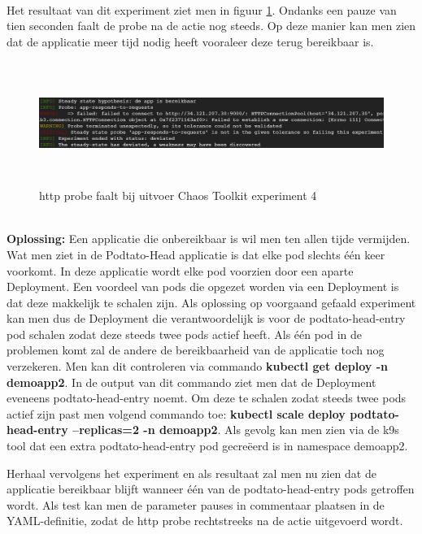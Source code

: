 \\ \newline Het resultaat van dit experiment ziet men in figuur \ref{img:chaostoolkitex4}. Ondanks een pauze van tien seconden faalt de probe na de actie nog steeds. Op deze manier kan men zien dat de applicatie meer tijd nodig heeft vooraleer deze terug bereikbaar is.

\begin{figure}[h]
    \centering
    \includegraphics[width=15cm, height=4cm]{img/chaostoolkit-ex4.png}
    \caption{http probe faalt bij uitvoer Chaos Toolkit experiment 4}
    \label{img:chaostoolkitex4}
\end{figure}

\\ {\bf Oplossing:} Een applicatie die onbereikbaar is wil men ten allen tijde vermijden. Wat men ziet in de Podtato-Head applicatie is dat elke pod slechts één keer voorkomt. In deze applicatie wordt elke pod voorzien door een aparte Deployment. Een voordeel van pods die opgezet worden via een Deployment is dat deze makkelijk te schalen zijn.
Als oplossing op voorgaand gefaald experiment kan men dus de Deployment die verantwoordelijk is voor de podtato-head-entry pod schalen zodat deze steeds twee pods actief heeft. Als één pod in de problemen komt zal de andere de bereikbaarheid van de applicatie toch nog verzekeren. 
Men kan dit controleren via commando {\bf kubectl get deploy -n demoapp2}. In de output van dit commando ziet men dat de Deployment eveneens podtato-head-entry noemt. Om deze te schalen zodat steeds twee pods actief zijn past men volgend commando toe: {\bf kubectl scale deploy podtato-head-entry --replicas=2 -n demoapp2}. Als gevolg kan men zien via de k9s tool dat een extra podtato-head-entry pod gecreëerd is in namespace demoapp2.

Herhaal vervolgens het experiment en als resultaat zal men nu zien dat de applicatie bereikbaar blijft wanneer één van de podtato-head-entry pods getroffen wordt. Als test kan men de parameter pauses in commentaar plaatsen in de YAML-definitie, zodat de http probe rechtstreeks na de actie uitgevoerd wordt.  

